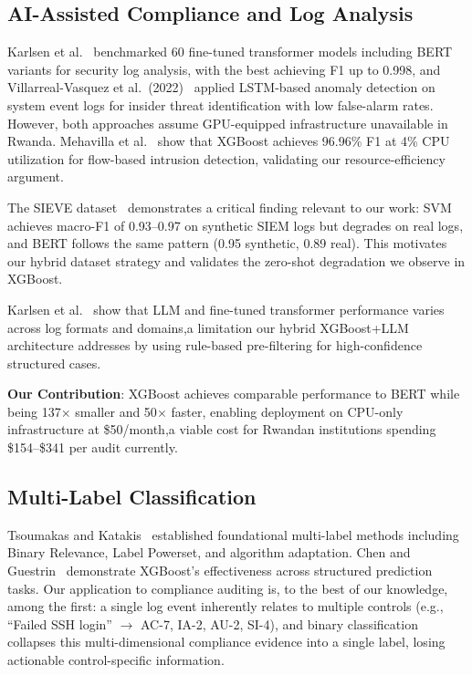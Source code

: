 \documentclass[futureinternet,article,submit,pdftex,moreauthors]{Definitions/mdpi}
\begin{document}
\subsection{AI-Assisted Compliance and Log Analysis}

Karlsen et al.~\cite{karlsen2024} benchmarked 60 fine-tuned transformer models including
BERT variants for security log analysis, with the best achieving F1 up to 0.998, and
Villarreal-Vasquez et al.\ (2022)~\cite{lstm_audit} applied LSTM-based anomaly detection
on system event logs for insider threat identification with low false-alarm rates. However, both approaches assume GPU-equipped
infrastructure unavailable in Rwanda. Mehavilla et al.~\cite{ferrag2025} show that XGBoost
achieves 96.96\% F1 at 4\% CPU utilization for flow-based intrusion detection, validating
our resource-efficiency argument.

The SIEVE dataset~\cite{sieve_dataset} demonstrates a critical finding relevant to our work:
SVM achieves macro-F1 of 0.93--0.97 on synthetic SIEM logs but degrades on real logs, and
BERT follows the same pattern (0.95 synthetic, 0.89 real). This motivates our hybrid dataset
strategy and validates the zero-shot degradation we observe in XGBoost.

Karlsen et al.~\cite{karlsen2024} show that LLM and fine-tuned transformer performance
varies across log formats and domains,a limitation our hybrid XGBoost+LLM architecture
addresses by using rule-based pre-filtering for high-confidence structured cases.

\textbf{Our Contribution}: XGBoost achieves comparable performance to BERT while being
137$\times$ smaller and 50$\times$ faster, enabling deployment on CPU-only infrastructure at
\$50/month,a viable cost for Rwandan institutions spending \$154--\$341 per audit currently.

\subsection{Multi-Label Classification}

Tsoumakas and Katakis~\cite{tsoumakas2007} established foundational multi-label methods
including Binary Relevance, Label Powerset, and algorithm adaptation. Chen and
Guestrin~\cite{chen2016xgboost} demonstrate XGBoost's effectiveness across structured
prediction tasks. Our application to compliance auditing is, to the best of our knowledge, among the first: a single log event
inherently relates to multiple controls (e.g., ``Failed SSH login'' $\rightarrow$ AC-7,
IA-2, AU-2, SI-4), and binary classification collapses this multi-dimensional compliance
evidence into a single label, losing actionable control-specific information.
\end{document}
